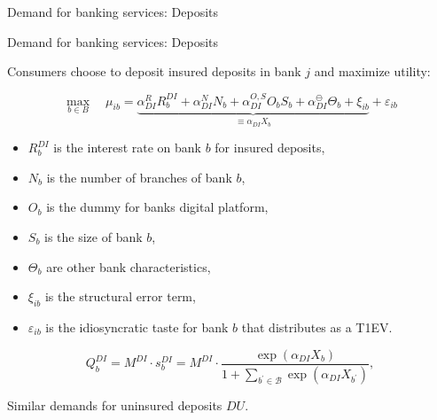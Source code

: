 \documentclass[notes,10pt, aspectratio=169]{beamer}
\newenvironment{wideitemize}{\itemize\addtolength{\itemsep}{10pt}}{\enditemize}
\begin{document}
\begin{frame}{Demand for banking services: Deposits}
\begin{wideitemize}

    \end{wideitemize}

\end{frame}

\begin{frame}{ Demand for banking services: Deposits}

    \begin{wideitemize}

        \item Consumers choose to deposit insured deposits in bank $j$  and maximize utility:
        
        $$
        \max _{b \in B} \quad \mu_{i b}=\underbrace{\alpha_{D I}^R R_b^{D I}+\alpha_{D I}^N N_b+\alpha_{D I}^{O, S} O_b S_b+\alpha_{D I}^{\ominus} \Theta_b+\xi_{i b}}_{\equiv \alpha_{D I} X_b}+\varepsilon_{i b}
        $$

        \begin{itemize}
            \item $R_b^{D I}$ is the interest rate on bank $b$ for insured deposits,
            \item $N_b$ is the number of branches of bank $b$,
            \item $O_b$ is the dummy for banks digital platform,
            \item $S_b$ is the size of bank $b$,
            \item $\Theta_b$ are other bank characteristics,
            \item $\xi_{i b}$ is the structural error term,
            \item $\varepsilon_{i b}$ is the idiosyncratic taste for bank $b$ that distributes as a T1EV.
        \end{itemize}

     $$   Q_b^{D I}=M^{D I} \cdot s_b^{D I}=M^{D I} \cdot \frac{\exp \left(\alpha_{D I} X_b\right)}{1+\sum_{b^{\prime} \in \mathcal{B}} \exp \left(\alpha_{D I} X_{b^{\prime}}\right)},$$
\item Similar demands for uninsured deposits $DU$.
    \end{wideitemize}


    \end{frame}
\end{document}
